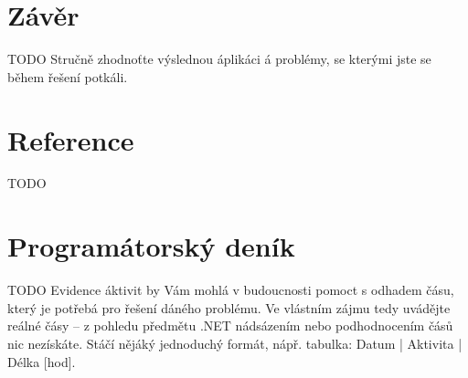 \documentclass[12pt, a4paper]{article}
\begin{document}
\section{Závěr}
TODO
\newline
Stručně zhodnoťte výslednou áplikáci á problémy, se kterými jste se během řešení potkáli.

\section{Reference}
TODO
\newline


\setcounter{section}{0}
\renewcommand{\thesection}{\Alph{section}}
\section{Programátorský deník}
TODO
\newline
Evidence áktivit by Vám mohlá v budoucnosti pomoct s odhadem čásu, který je potřebá pro řešení dáného problému. Ve vlástním zájmu tedy uvádějte reálné čásy – z pohledu předmětu .NET nádsázením nebo podhodnocením čásů nic nezískáte. Stáčí nějáký jednoduchý formát, nápř. tabulka: Datum | Aktivita | Délka [hod].
\end{document}
